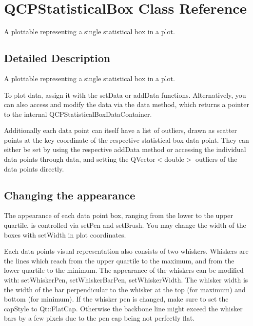 \hypertarget{class_q_c_p_statistical_box}{}\section{Q\+C\+P\+Statistical\+Box Class Reference}
\label{class_q_c_p_statistical_box}


A plottable representing a single statistical box in a plot.  




\subsection{Detailed Description}
A plottable representing a single statistical box in a plot. 



To plot data, assign it with the set\+Data or add\+Data functions. Alternatively, you can also access and modify the data via the data method, which returns a pointer to the internal Q\+C\+P\+Statistical\+Box\+Data\+Container.

Additionally each data point can itself have a list of outliers, drawn as scatter points at the key coordinate of the respective statistical box data point. They can either be set by using the respective add\+Data method or accessing the individual data points through data, and setting the {\ttfamily Q\+Vector$<$double$>$ outliers} of the data points directly.\hypertarget{class_q_c_p_statistical_box_qcpstatisticalbox-appearance}{}\subsection{Changing the appearance}\label{class_q_c_p_statistical_box_qcpstatisticalbox-appearance}
The appearance of each data point box, ranging from the lower to the upper quartile, is controlled via set\+Pen and set\+Brush. You may change the width of the boxes with set\+Width in plot coordinates.

Each data point\textquotesingle{}s visual representation also consists of two whiskers. Whiskers are the lines which reach from the upper quartile to the maximum, and from the lower quartile to the minimum. The appearance of the whiskers can be modified with\+: set\+Whisker\+Pen, set\+Whisker\+Bar\+Pen, set\+Whisker\+Width. The whisker width is the width of the bar perpendicular to the whisker at the top (for maximum) and bottom (for minimum). If the whisker pen is changed, make sure to set the {\ttfamily cap\+Style} to {\ttfamily Qt\+::\+Flat\+Cap}. Otherwise the backbone line might exceed the whisker bars by a few pixels due to the pen cap being not perfectly flat.

